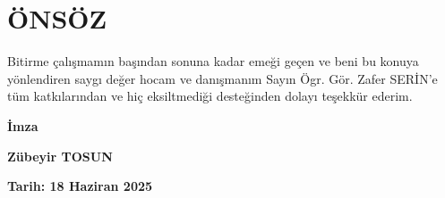 \section*{ÖNSÖZ}
\vspace{.5cm}
Bitirme çalışmamın başından sonuna kadar emeği geçen ve beni bu konuya yönlendiren saygı değer hocam ve danışmanım Sayın Ögr. Gör. Zafer SERİN’e tüm katkılarından ve hiç eksiltmediği desteğinden dolayı teşekkür ederim.

\vspace{2cm}
\begin{flushright}
\begin{minipage}{5cm}
\begin{center}
\textbf{İmza}

\textbf{Zübeyir TOSUN}

\textbf{Tarih: {18 Haziran 2025}}\hfill
\end{center}
\end{minipage}
\end{flushright}
